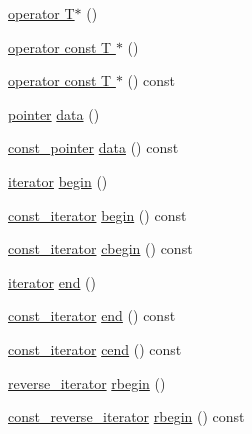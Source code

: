 \begin{DoxyCompactItemize}
\item 
\hyperlink{classtrimesh_1_1XForm_ab856fb81a44b1c58a02f1787873aaa12}{operator T$\ast$} ()
\item 
\hyperlink{classtrimesh_1_1XForm_a40f98910aba7ce8cead829ef89cfa20d}{operator const T $\ast$} ()
\item 
\hyperlink{classtrimesh_1_1XForm_a720d0b7d15136abbf52411933f54fe3d}{operator const T $\ast$} () const
\item 
\hyperlink{classtrimesh_1_1XForm_a0ff7a6cb20d209f32be3ab3779077029}{pointer} \hyperlink{classtrimesh_1_1XForm_aa0e187a87bb6f928a0d97369a037920a}{data} ()
\item 
\hyperlink{classtrimesh_1_1XForm_a0cfc3dd93b0190520e3152ef27a32117}{const\+\_\+pointer} \hyperlink{classtrimesh_1_1XForm_a2b15919c5025ee49748b8154b8e48877}{data} () const
\item 
\hyperlink{classtrimesh_1_1XForm_a8894e55e986e53231663e774060ca200}{iterator} \hyperlink{classtrimesh_1_1XForm_ae1f0dbbd390cf148f7fe35cc47172a13}{begin} ()
\item 
\hyperlink{classtrimesh_1_1XForm_af342cefd0ecc382861c2d89f24423d71}{const\+\_\+iterator} \hyperlink{classtrimesh_1_1XForm_a34ec57124b453b83f4941537eb112c54}{begin} () const
\item 
\hyperlink{classtrimesh_1_1XForm_af342cefd0ecc382861c2d89f24423d71}{const\+\_\+iterator} \hyperlink{classtrimesh_1_1XForm_ac1b00950e877fe703998bca3e5cfefc1}{cbegin} () const
\item 
\hyperlink{classtrimesh_1_1XForm_a8894e55e986e53231663e774060ca200}{iterator} \hyperlink{classtrimesh_1_1XForm_ac5474374e32212bf81d416429ceee288}{end} ()
\item 
\hyperlink{classtrimesh_1_1XForm_af342cefd0ecc382861c2d89f24423d71}{const\+\_\+iterator} \hyperlink{classtrimesh_1_1XForm_a065733b995c5b9c6b7f9bf36ef2b6514}{end} () const
\item 
\hyperlink{classtrimesh_1_1XForm_af342cefd0ecc382861c2d89f24423d71}{const\+\_\+iterator} \hyperlink{classtrimesh_1_1XForm_a1321a5e276125d12ad03ba047c5156ce}{cend} () const
\item 
\hyperlink{classtrimesh_1_1XForm_a4729ea67a4ad434be421b066af3b672c}{reverse\+\_\+iterator} \hyperlink{classtrimesh_1_1XForm_a8a98f35aaf5fa6cd809020215cae3bc2}{rbegin} ()
\item 
\hyperlink{classtrimesh_1_1XForm_a00d4231576ef7499e29885da090e807f}{const\+\_\+reverse\+\_\+iterator} \hyperlink{classtrimesh_1_1XForm_a34e2a37d8c9bce6b37f149afd2b23b68}{rbegin} () const
\item 

\end{DoxyCompactItemize}
